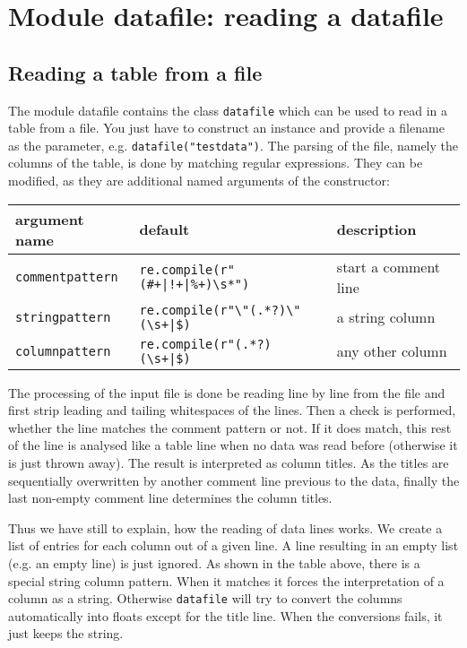 \chapter{Module datafile: reading a datafile}

\section{Reading a table from a file}

The module datafile contains the class \verb|datafile| which can be
used to read in a table from a file. You just have to construct an
instance and provide a filename as the parameter, e.g.
\verb|datafile("testdata")|. The parsing of the file, namely the
columns of the table, is done by matching regular expressions. They
can be modified, as they are additional named arguments of the
constructor:

\medskip
\begin{tabularx}{\linewidth}{ll>{\raggedright\arraybackslash}X}
argument name&default&description\\
\hline
\texttt{commentpattern}&\texttt{re.compile(r"(\#+|!+|\%+)\textbackslash s*")}&start a comment line\\
\texttt{stringpattern}&\texttt{re.compile(r"\textbackslash"(.*?)\textbackslash"(\textbackslash s+|\$)}&a string column\\
\texttt{columnpattern}&\texttt{re.compile(r"(.*?)(\textbackslash s+|\$)}&any other column\\
\end{tabularx}
\medskip

The processing of the input file is done be reading line by line from
the file and first strip leading and tailing whitespaces of the lines.
Then a check is performed, whether the line matches the comment
pattern or not. If it does match, this rest of the line is analysed
like a table line when no data was read before (otherwise it is just
thrown away). The result is interpreted as column titles. As the
titles are sequentially overwritten by another comment line previous
to the data, finally the last non-empty comment line determines the
column titles.

Thus we have still to explain, how the reading of data lines works. We
create a list of entries for each column out of a given line. A line
resulting in an empty list (e.g. an empty line) is just ignored. As
shown in the table above, there is a special string column pattern.
When it matches it forces the interpretation of a column as a string.
Otherwise \verb|datafile| will try to convert the columns
automatically into floats except for the title line. When the
conversions fails, it just keeps the string.

